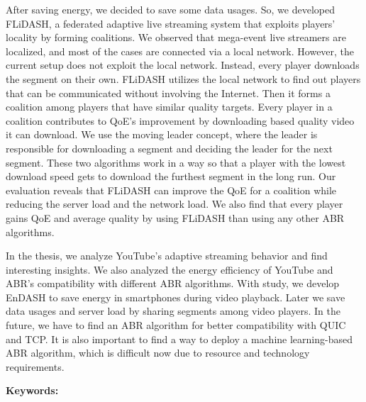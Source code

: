 {After saving energy, we decided to save some data usages. So, we developed FLiDASH, a federated adaptive live streaming system that exploits players' locality by forming coalitions. We observed that mega-event live streamers are localized, and most of the cases are connected via a local network. However, the current setup does not exploit the local network. Instead, every player downloads the segment on their own. FLiDASH utilizes the local network to find out players that can be communicated without involving the Internet. Then it forms a coalition among players that have similar quality targets. Every player in a coalition contributes to QoE's improvement by downloading based quality video it can download. We use the moving leader concept, where the leader is responsible for downloading a segment and deciding the leader for the next segment. These two algorithms work in a way so that a player with the lowest download speed gets to download the furthest segment in the long run. Our evaluation reveals that FLiDASH can improve the QoE for a coalition while reducing the server load and the network load. We also find that every player gains QoE and average quality by using FLiDASH than using any other ABR algorithms.

In the thesis, we analyze YouTube's adaptive streaming behavior and find interesting insights. We also analyzed the energy efficiency of YouTube and ABR's compatibility with different ABR algorithms. With study, we develop EnDASH to save energy in smartphones during video playback. Later we save data usages and server load by sharing segments among video players. In the future, we have to find an ABR algorithm for better compatibility with QUIC and TCP. It is also important to find a way to deploy a machine learning-based ABR algorithm, which is difficult now due to resource and technology requirements.

\textbf{Keywords:}
}

